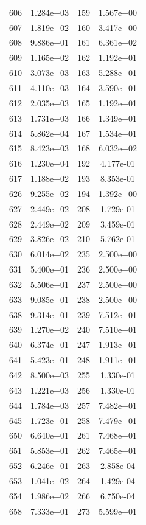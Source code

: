 \documentclass[12pt]{article}
\begin{document}
\begin{longtable}{@{}cccc@{}}
606 & 1.284e+03 & 159 & 1.567e+00 \\
607 & 1.819e+02 & 160 & 3.417e+00 \\
608 & 9.886e+01 & 161 & 6.361e+02 \\
609 & 1.165e+02 & 162 & 1.192e+01 \\
610 & 3.073e+03 & 163 & 5.288e+01 \\
611 & 4.110e+03 & 164 & 3.590e+01 \\
612 & 2.035e+03 & 165 & 1.192e+01 \\
613 & 1.731e+03 & 166 & 1.349e+01 \\
614 & 5.862e+04 & 167 & 1.534e+01 \\
615 & 8.423e+03 & 168 & 6.032e+02 \\
616 & 1.230e+04 & 192 & 4.177e-01 \\
617 & 1.188e+02 & 193 & 8.353e-01 \\
626 & 9.255e+02 & 194 & 1.392e+00 \\
627 & 2.449e+02 & 208 & 1.729e-01 \\
628 & 2.449e+02 & 209 & 3.459e-01 \\
629 & 3.826e+02 & 210 & 5.762e-01 \\
630 & 6.014e+02 & 235 & 2.500e+00 \\
631 & 5.400e+01 & 236 & 2.500e+00 \\
632 & 5.506e+01 & 237 & 2.500e+00 \\
633 & 9.085e+01 & 238 & 2.500e+00 \\
638 & 9.314e+01 & 239 & 7.512e+01 \\
639 & 1.270e+02 & 240 & 7.510e+01 \\
640 & 6.374e+01 & 247 & 1.913e+01 \\
641 & 5.423e+01 & 248 & 1.911e+01 \\
642 & 8.500e+03 & 255 & 1.330e-01 \\
643 & 1.221e+03 & 256 & 1.330e-01 \\
644 & 1.784e+03 & 257 & 7.482e+01 \\
645 & 1.723e+01 & 258 & 7.479e+01 \\
650 & 6.640e+01 & 261 & 7.468e+01 \\
651 & 5.853e+01 & 262 & 7.465e+01 \\
652 & 6.246e+01 & 263 & 2.858e-04 \\
653 & 1.041e+02 & 264 & 1.429e-04 \\
654 & 1.986e+02 & 266 & 6.750e-04 \\
658 & 7.333e+01 & 273 & 5.599e+01 \\

\end{longtable}
\end{document}
